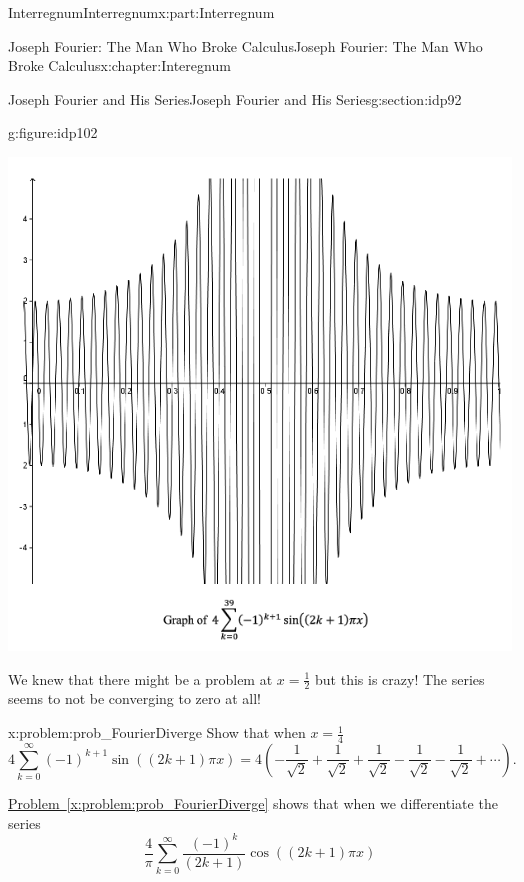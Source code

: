 \begin{partptx}{Interregnum}{}{Interregnum}{}{}{x:part:Interregnum}
\begin{chapterptx}{Joseph Fourier: The Man Who Broke Calculus}{}{Joseph Fourier: The Man Who Broke Calculus}{}{}{x:chapter:Interegnum}
\begin{sectionptx}{Joseph Fourier and His Series}{}{Joseph Fourier and His Series}{}{}{g:section:idp92}
\begin{figureptx}{}{g:figure:idp102}{}
\begin{image}{0}{1}{0}
					\includegraphics[width=\linewidth]{external/images/FourierEx11.png}
				\end{image}%
				\tcblower
			\end{figureptx}%
			\par
			We knew that there might be a problem at \(x=\frac{1}{2}\) but this is crazy! The series seems to not be converging to zero at all!%
			\begin{problem}{}{x:problem:prob_FourierDiverge}%
				 Show that when \(x=\frac{1}{4}\)%
				\begin{equation*}
					4\sum_{k=0}^\infty\left(-1\right)^{k+1} \sin\left(\left(2k+1\right)\pi x\right)=4\left(-\frac{1}{\sqrt{2}}+\frac{1}{\sqrt{2}}+\frac{1}{\sqrt{2}}- \frac{1}{\sqrt{2}}-\frac{1}{\sqrt{2}}+\cdots\right)\text{.}
				\end{equation*}
			\end{problem}
			\hyperref[x:problem:prob_FourierDiverge]{Problem~{\xreffont\ref{x:problem:prob_FourierDiverge}}} shows that when we differentiate the series%
			\begin{equation*}
				\frac{4}{\pi}\sum_{k=0}^\infty\frac{\left(-1\right)^k}{\left(2k+1\right)} \cos\left(\left(2k+1\right)\pi x\right)
			\end{equation*}

\end{sectionptx}
\end{chapterptx}
\end{partptx}
